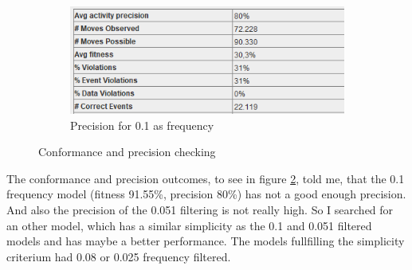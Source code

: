 \begin{figure}[!htbp]
\begin{subfigure}{.4\textwidth}
  \centering
  \includegraphics[width=\linewidth]{P_Precision0-1.PNG}
  \caption{Precision for 0.1 as frequency}
  \label{fig:P_Prec0-1}
\end{subfigure}
\caption{Conformance and precision checking}
\label{fig:P_ConfPrec}
\end{figure}


The conformance and precision outcomes, to see in figure \ref{fig:P_ConfPrec}, told me, that the 0.1 frequency model (fitness 91.55\%, precision 80\%) has not a good enough precision. And also the precision of the 0.051 filtering is not really high. So I searched for an other model, which has a similar simplicity as the 0.1 and 0.051 filtered models and has maybe a better performance. The models fullfilling the simplicity criterium had 0.08 or 0.025 frequency filtered.

